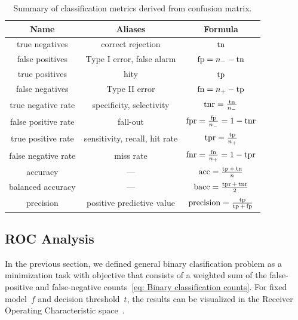 \begin{table}
  \centering
  \begin{NiceTabular}{ccc}
    \toprule
    \textbf{Name} & \textbf{Aliases} & \textbf{Formula} \\
    \midrule
    true negatives
      & correct rejection
      & $\operatorname{tn}$ \\
    false positives
      & Type I error, false alarm
      & $\operatorname{fp} = n_{-} - \operatorname{tn}$ \\
    true positives
      & hity
      & $\operatorname{tp}$ \\
    false negatives
      & Type II error
      & $\operatorname{fn} = n_{+} - \operatorname{tp}$ \\
    \midrule
    true negative rate
      & specificity, selectivity
      & $\operatorname{tnr} = \frac{\operatorname{tn}}{n_{-}}$ \\
    false positive rate
      & fall-out
      & $\operatorname{fpr} = \frac{\operatorname{fp}}{n_{-}} = 1 - \operatorname{tnr}$ \\
    true positive rate
      & sensitivity, recall, hit rate
      & $\operatorname{tpr} = \frac{\operatorname{tp}}{n_{+}}$ \\
    false negative rate
      & miss rate
      & $\operatorname{fnr} = \frac{\operatorname{fn}}{n_{+}} = 1 - \operatorname{tpr}$ \\
    \midrule
    accuracy
      & ---
      & $\operatorname{acc} = \frac{\operatorname{tp} + \operatorname{tn}}{n}$ \\
    balanced accuracy
      & ---
      & $\operatorname{bacc} = \frac{\operatorname{tpr} + \operatorname{tnr}}{2}$ \\
    precision
      & positive predictive value
      & $\operatorname{precision} = \frac{\operatorname{tp}}{\operatorname{tp} + \operatorname{fp}}$ \\
    \bottomrule
  \end{NiceTabular}
  \caption{Summary of classification metrics derived from confusion matrix.}
  \label{tab: classification metrics}
\end{table}

\subsection{ROC Analysis}

In the previous section, we defined general binary clasification problem as a minimization task with objective that consists of a weighted sum of the false-positive and false-negative counts~\eqref{eq: Binary classification counts}. For fixed model~$f$ and decision threshold~$t$, the results can be visualized in the Receiver Operating Characteristic space~\cite{egan1975signal}.


